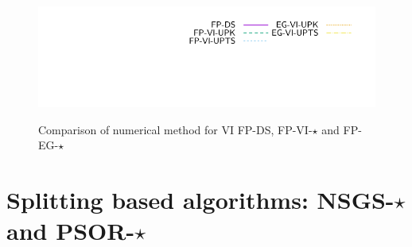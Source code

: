 \documentclass[a4paper]{article}
\begin{document}
\begin{figure}[htbp]
{\includegraphics[height=\legendheight]{../figure/VI/UpdateRule/1.0e-08/50/time/profile-Chain_legend.pdf}} 
   \caption{Comparison of numerical method for VI  {\sf FP-DS, FP-VI-$\star$} and {\sf FP-EG-$\star$}}
\label{fig:VI/UpdateRule}
\end{figure}

\section{Splitting based algorithms: {\sf NSGS-$\star$} and {\sf PSOR-$\star$}}
\end{document}
